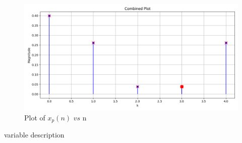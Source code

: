 \documentclass[journal,12pt,twocolumn]{IEEEtran}
\theoremstyle{remark}
\begin{document}
\begin{figure}[ht]
    \centering
    \includegraphics[width=\columnwidth]{figs/Figure_3.png}
    \caption{Plot of $x_p(n)$ $vs$ n}
    \label{fig:GATE.2023.EE.50.3}
\end{figure}
\begin{table}[h!]
    \centering
    
    \caption{variable description}
    \label{tab:GATE.2023.EE.50.4}
\end{table}\\
\end{document}
